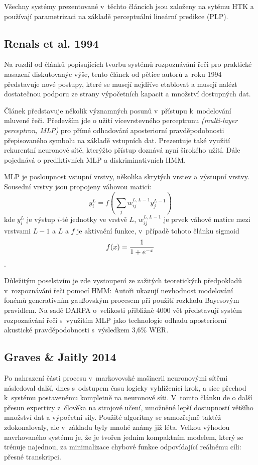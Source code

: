 Všechny systémy prezentované v~těchto článcích jsou založeny na sytému HTK a
používají parametrizaci na základě perceptuální lineární predikce (PLP).

\subsection{Renals et al. 1994}

Na rozdíl od článků popisujících tvorbu systémů rozpoznávání řeči pro praktické
nasazení diskutovanýc výše, tento článek od pětice autorů z~roku
1994\cite{renals1994connectionist} představuje nové postupy, které se musejí
nejdříve etablovat a musejí nalézt dostatečnou podporu ze strany výpočetních
kapacit a množství dostupných dat.

Článek představuje několik významných posunů v~přístupu k~modelování mluvené
řeči. Především jde o užití vícevrstevného perceptronu \textit{(multi-layer
perceptron, MLP)} pro přímé odhadování aposteriorní pravděpodobnosti
přepisovaného symbolu na základě vstupních dat. Prezentuje také využití
rekurentní neuronové sítě, kterýžto přístup doznává nyní širokého užití. Dále
pojednává o prediktivních MLP a diskriminativních HMM.

MLP je posloupnost vstupní vrstvy, několika skrytých vrstev a výstupní vrstvy.
Sousední vrstvy jsou propojeny váhovou maticí:
\begin{equation}
y_i^L = f(\sum_j w_{ij}^{L,L-1}y_j^{L-1})
\end{equation}
kde $y_i^L$ je výstup $i$-té jednotky ve vrstvě $L$,
$w_{ij}^{L,L-1}$ je prvek váhové matice mezi vrstvami $L - 1$ a $L$
a $f$ je aktivační funkce, v~případě tohoto článku sigmoid
\begin{equation}
f(x) = {{1}\over{1 + e^{-x}}}
\end{equation}.

Důležitým poselstvím je zde vystoupení ze zažitých teoretických předpokladů
v~rozpoznávání řeči pomocí HMM: Autoři ukazují nevhodnost modelování fonémů
generativním gaußovským procesem při použití rozkladu Bayesovým pravidlem.
Na sadě DARPA o~velikosti přibližně 4000 vět představují systém rozpoznávání
řeči s~využitím MLP jako technologie odhadu aposteriorní akustické
pravděpodobnosti s~výsledkem 3,6\% WER.

\subsection{Graves \& Jaitly 2014}

Po nahrazení části procesu v~markovovské mašinerii neuronovými sítěmi následoval
další, dnes s~odstupem času logicky vyhlíženící krok, a sice přechod k~systému
postavenému kompletně na neuronové síti. V~tomto článku\cite{graves2014towards}
de o další přesun expertizy z~člověka na strojové učení, umožněné lepší
dostupností většího množství dat a výpočetní síly. Použité algoritmy se
samozřejmě taktéž zdokonalovaly, ale v~základu byly mnohé známy již léta. Velkou
výhodou navrhovaného systému je, že je tvořen jedním kompaktním modelem, který
se trénuje najednou, za minimalizace chybové funkce odpovídající reálnému cíli:
přesné transkripci.

